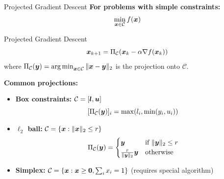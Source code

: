 \documentclass[aspectratio=169]{beamer}
\begin{document}
\begin{frame}{Projected Gradient Descent}
  \textbf{For problems with simple constraints:}
  $$\min_{\boldsymbol{x} \in \mathcal{C}} f(\boldsymbol{x})$$

  \vspace{0.5em}

  \begin{definitionbox}{Projected Gradient Descent}
    $$\boldsymbol{x}_{k+1} = \Pi_{\mathcal{C}}(\boldsymbol{x}_k - \alpha \nabla f(\boldsymbol{x}_k))$$
    where $\Pi_{\mathcal{C}}(\boldsymbol{y}) = \operatorname*{arg\,min}_{\boldsymbol{x} \in \mathcal{C}} \|\boldsymbol{x} - \boldsymbol{y}\|_2$ is the projection onto $\mathcal{C}$.
  \end{definitionbox}

  \vspace{0.5em}

  \textbf{Common projections:}
  \begin{itemize}
    \item \textbf{Box constraints:} $\mathcal{C} = [\boldsymbol{l}, \boldsymbol{u}]$
    $$[\Pi_{\mathcal{C}}(\boldsymbol{y})]_i = \max(l_i, \min(y_i, u_i))$$

    \item \textbf{$\ell_2$ ball:} $\mathcal{C} = \{\boldsymbol{x} : \|\boldsymbol{x}\|_2 \leq r\}$
    $$\Pi_{\mathcal{C}}(\boldsymbol{y}) = \begin{cases} \boldsymbol{y} & \text{if } \|\boldsymbol{y}\|_2 \leq r \\ \frac{r}{\|\boldsymbol{y}\|_2}\boldsymbol{y} & \text{otherwise} \end{cases}$$

    \item \textbf{Simplex:} $\mathcal{C} = \{\boldsymbol{x} : \boldsymbol{x} \geq \boldsymbol{0}, \sum_i x_i = 1\}$ (requires special algorithm)
  \end{itemize}
\end{frame}
\end{document}

